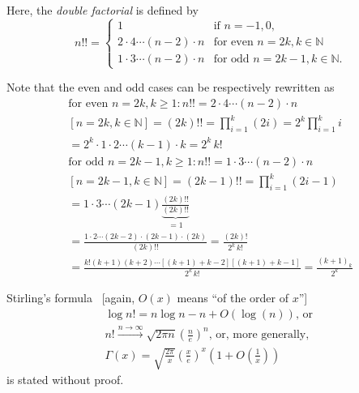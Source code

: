 Here, the
{\em  double factorial}
 is defined by
\begin{equation}
n!!=
\begin{cases}
1   & \text{if } n=-1,0,  \\
2\cdot 4\cdots (n-2)\cdot n&\text{for even }   n= 2k ,  k\in \mathbb{N} \\
1\cdot 3 \cdots (n-2) \cdot  n &\text{for odd }  n= 2k-1 ,  k\in \mathbb{N} .
\end{cases}
\end{equation}

Note that the even and odd cases can be respectively rewritten as
\begin{equation}
\begin{split}
\text{for even }   n= 2k ,  k\ge 1:
n!!= 2\cdot 4\cdots (n-2)\cdot n\\
[n= 2k, k\in\mathbb{N}] =  (2k)!!
  =  \prod_{i=1}^k (2i)= 2^{k} \prod_{i=1}^k i\\
  =  2^{k}\cdot  1\cdot 2\cdots (k-1)\cdot k = 2^k\, k!
\\
\text{for odd }  n= 2k-1 ,  k\ge 1:
n!!= 1\cdot 3 \cdots (n-2) \cdot  n \\
[n= 2k-1, k\in\mathbb{N}] =(2k-1)!!
 =  \prod_{i=1}^k (2i-1) \\
  = 1\cdot 3 \cdots  (2k-1)  \underbrace{\frac{(2k)!!}{(2k)!!}}_{=1}    \\
  = \frac{1\cdot 2 \cdots (2k-2) \cdot  (2k-1)\cdot  (2k)}{(2k)!!}   =  \frac{(2k)!}{2^k \,k!}\\
  = \frac{k! (k+1)(k+2) \cdots [(k+1)+k-2][(k+1)+k-1] }{2^k \,k!}
  =  \frac{(k+1)_k }{2^k }
\end{split}
\end{equation}



Stirling's formula~\cite{Namias-1986}
[again, $O(x)$ means ``of the order of $x$'']
\begin{equation}
\begin{split}
\log n! = n \log n -n + O(\log (n))\textrm{, or }   \\
n! \stackrel{n\rightarrow \infty}{\longrightarrow} \sqrt{2\pi n} \left(\frac{n}{e}\right)^n
\textrm{, or, more generally, }\\
\Gamma (x) = \sqrt{\frac{2\pi }{x}}\left(\frac{x}{e}\right)^x \left( 1+ O\left(\frac{1}{x}\right) \right)
\end{split}
\end{equation}
is stated without proof.

